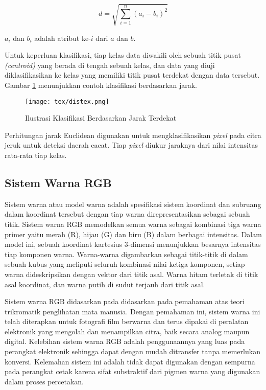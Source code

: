 \documentclass[laporan.tex]{subfiles}
\begin{document}
\begin{equation}
	d=\sqrt{\sum_{i=1}^n (a_i - b_i)^2}
\end{equation}

$a_i$ dan $b_i$ adalah atribut ke-$i$ dari $a$ dan $b$.

Untuk keperluan klasifikasi, tiap kelas data diwakili oleh sebuah titik pusat \emph{(centroid)} yang berada di tengah sebuah kelas, dan data yang diuji diklasifikasikan ke kelas yang memiliki titik pusat terdekat dengan data tersebut. Gambar \ref{fig:distex} menunjukkan contoh klasifikasi berdasarkan jarak.

\begin{figure}[h]
\centering
\texttt{[image: tex/distex.png]}
\caption{Ilustrasi Klasifikasi Berdasarkan Jarak Terdekat}
\label{fig:distex}
\end{figure}

Perhitungan jarak Euclidean digunakan untuk mengklasifikasikan \emph{pixel} pada citra jeruk untuk deteksi daerah cacat. Tiap \emph{pixel} diukur jaraknya dari nilai intensitas rata-rata tiap kelas.

\subsection{Sistem Warna RGB}
Sistem warna atau model warna adalah spesifikasi sistem koordinat dan subruang dalam koordinat tersebut dengan tiap warna direpresentasikan sebagai sebuah titik. Sistem warna RGB memodelkan semua warna sebagai kombinasi tiga warna primer yaitu merah (R), hijau (G) dan biru (B) dalam berbagai intensitas. Dalam model ini, sebuah koordinat kartesius 3-dimensi menunjukkan besarnya intensitas tiap komponen warna. Warna-warna digambarkan sebagai titik-titik di dalam sebuah kubus yang meliputi seluruh kombinasi nilai ketiga komponen, setiap warna dideskripsikan dengan vektor dari titik asal. Warna hitam terletak di titik asal koordinat, dan warna putih di sudut terjauh dari titik asal\cite{gon}.

Sistem warna RGB didasarkan pada didasarkan pada pemahaman atas teori trikromatik penglihatan mata manusia. Dengan pemahaman ini, sistem warna ini telah diterapkan untuk fotografi film berwarna dan terus dipakai di peralatan elektronik yang mengolah dan menampilkan citra, baik secara analog maupun digital. Kelebihan sistem warna RGB adalah penggunaannya yang luas pada perangkat elektronik sehingga dapat dengan mudah ditransfer tanpa memerlukan konversi. Kelemahan sistem ini adalah tidak dapat digunakan dengan sempurna pada perangkat cetak karena sifat substraktif dari pigmen warna yang digunakan dalam proses percetakan. 
\end{document}
